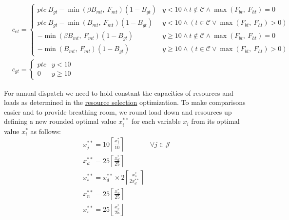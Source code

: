 \documentclass[9pt, oneside]{article}
\numberwithin{equation}{subsubsection}
\begin{document}
\begin{subequations}
\begin{align}
		 & c_{et} = \left\{
		\begin{array}{ll}
			ptc\; B_{gt} - \min \left(\beta B_{mt}, \:F_{mt} \right)\left(1-B_{gt}\right) & y < 10 \wedge t \notin \mathcal{C} \wedge \max \left( F_{bt} ,\: F_{ht}\right) = 0    \\[0.3em]
			ptc\; B_{gt} - \min \left( B_{mt},\: F_{mt} \right)\left(1-B_{gt}\right)      & y < 10 \wedge ( t \in \mathcal{C} \vee \max \left( F_{bt} ,\: F_{ht}\right) > 0 )     \\[0.3em]
			- \min \left(\beta B_{mt},\: F_{mt} \right)\left(1-B_{gt}\right)              & y \geq 10 \wedge t \notin \mathcal{C} \wedge \max \left( F_{bt} ,\: F_{ht}\right) = 0 \\[0.3em]
			- \min \left( B_{mt},\: F_{mt} \right) \left(1-B_{gt}\right)                  & y \geq 10 \wedge ( t \in \mathcal{C} \vee \max \left( F_{bt} ,\: F_{ht}\right) > 0 )
		\end{array} \right. \\[0.5em]
		 & c_{gt} = \left\{
		\begin{array}{ll}
			ptc & y < 10    \\[0.5em]
			0   & y \geq 10
		\end{array} \right.
	\end{align}
\end{subequations}

For annual dispatch we need to hold constant the capacities of resources and loads as determined in the \hyperref[sec:res]{resource selection} optimization.
To make comparisons easier and to provide breathing room, we round load down and resources up defining a new rounded optimal value $x_i^{**}$ for each variable $x_i$ from its optimal value $x_i^{*}$ as follows:
\begin{subequations}
	\begin{align}
		 & x_j^{**} = 10 \left\lceil{\frac{x_j^*}{10}}\right\rceil                                                                                                    & \forall j \in \mathcal{J} & \\
		 & x_{d}^{**} = 25 \left\lceil{\frac{x_d^*}{25}}\right\rceil                                                                                                  &                           & \\
		 & x_{s}^{**} = x_{d}^{**} \times 2 \left\lceil \frac{ x_s^* }{2x_{d}^{**}} \right\rceil &                           & \\
		 & x_{n}^{**} = 25 \left\lceil{\frac{x_n^*}{25}}\right\rceil                                                                                                  &                           & \\
		 & x_{v}^{**} = 25 \left\lfloor{\frac{x_v^*}{25}}\right\rfloor                                                                                                 &                           &
	\end{align}
\end{subequations}
\end{document}
